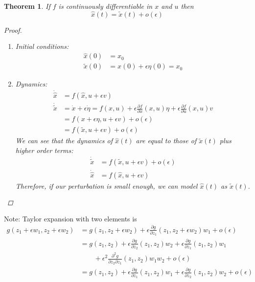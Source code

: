 \documentclass[letterpaper,12pt,titlepage]{report}
\newcommand*\pder[2]{\frac{\partial #1}{\partial #2}}
\theoremstyle{plain}
\newtheorem*{thm}{Theorem}
\theoremstyle{definition}
\begin{document}
\begin{thm}
  If $f$ is continuously differentiable in $x$ and $u$ then
  \[ \hat x(t) = \tilde x(t) + o(\epsilon) \]
  \begin{proof}
    \mbox{}
    \begin{enumerate}[label=\roman*)]
    \item Initial conditions:
      \begin{align}
        \hat x(0) &= x_0 \\
        \tilde x(0) &= x(0) + \epsilon \eta(0) = x_0
      \end{align}
    \item Dynamics:
      \begin{align}
        \dot{\hat x} &= f(\hat x,u+\epsilon v) \\
        \dot{\tilde x} &= \dot x + \epsilon \dot \eta = f(x,u) + \epsilon \pder{f}{x}(x,u)\eta + \epsilon \pder{f}{u}(x,u) v \\
                     &= f(x+\epsilon\eta,u+\epsilon v) + o(\epsilon) \\
                     &= f(\tilde x,u+\epsilon v) + o(\epsilon)
      \end{align}
      We can see that the dynamics of $\hat x(t)$ are equal to those of $\tilde x(t)$ plus higher order terms:
      \begin{align}
        \dot{\tilde x} &= f(\tilde x,u+\epsilon v) + o(\epsilon) \\
        \dot{\hat x} &= f(\hat x,u+\epsilon v)
      \end{align}
      Therefore, if our perturbation is small enough, we can model $\hat x(t)$ as $\tilde x(t)$.
    \end{enumerate}
  \end{proof}
\end{thm}
Note: Taylor expansion with two elements is
\begin{align}
  g(z_1+\epsilon w_1,z_2+\epsilon w_2) &= g(z_1,z_2+\epsilon w_2) + \epsilon\pder{g}{z_1}(z_1,z_2+\epsilon w_2) w_1 + o(\epsilon) \\
                                       &= g(z_1,z_2) + \epsilon\pder{g}{z_2}(z_1,z_2)w_2 + \epsilon\pder{g}{z_1}(z_1,z_2)w_1 \\
                                       & \qquad + \epsilon^2\pder{^2 g}{z_2\partial z_1}(z_1,z_2)w_1w_2 + o(\epsilon) \\
                                       &= g(z_1,z_2) + \epsilon\pder{g}{z_1}(z_1,z_2)w_1 + \epsilon\pder{g}{z_2}(z_1,z_2)w_2 + o(\epsilon)
\end{align}

\end{document}
